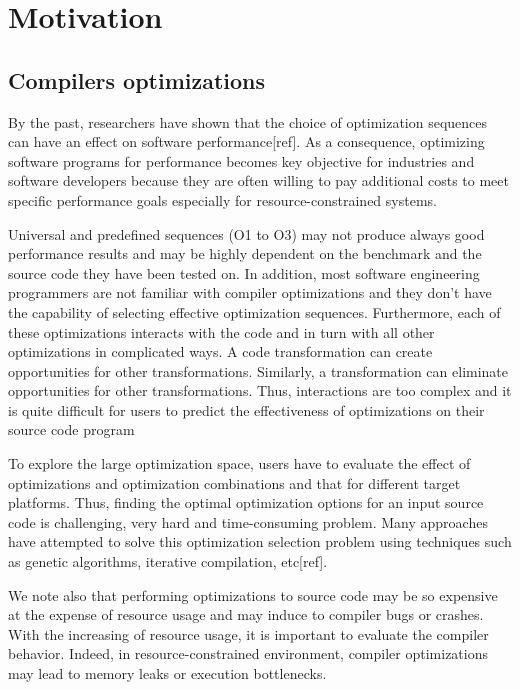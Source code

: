 \section{Motivation}
\subsection{Compilers optimizations}
By the past, researchers have shown that the choice of optimization sequences can have an effect on software performance[ref]. As a consequence, optimizing software programs for performance becomes key objective for industries and software developers because they are often willing to pay additional costs to meet specific performance goals especially for resource-constrained systems.

Universal and predefined sequences (O1 to O3) may not produce always good performance results and may be highly dependent on the benchmark and the source code they have been tested on\cite{almagor2004finding}\cite{hoste2008cole}.
In addition, most software engineering programmers are
not familiar with compiler optimizations and they don't have
the capability of selecting effective optimization sequences.
Furthermore, each of these optimizations interacts with the
code and in turn with all other optimizations in complicated
ways. A code transformation can create opportunities for other transformations. Similarly, a transformation can eliminate opportunities for other transformations. Thus, interactions are too complex and it is quite difficult for users to predict the effectiveness of optimizations on their source code program

To explore the large optimization space, users have to
evaluate the effect of optimizations and optimization combinations and that for different target platforms. Thus, finding the optimal optimization options for an input source code is challenging, very hard and time-consuming problem. Many approaches have attempted to solve this optimization selection problem using techniques such as genetic algorithms, iterative compilation, etc[ref].



We note also that performing optimizations to source code
may be so expensive at the expense of resource usage and
may induce to compiler bugs or crashes. With the increasing
of resource usage, it is important to evaluate the compiler
behavior. Indeed, in resource-constrained environment, compiler optimizations may lead to memory leaks or execution
bottlenecks. 


